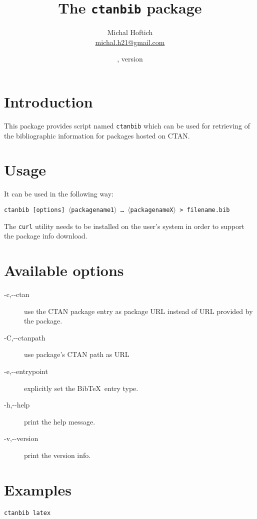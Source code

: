 \documentclass{ltxdoc}
\title{The \texttt{ctanbib} package}
\author{Michal Hoftich\\\href{mailto:michal.h21@gmail.com}{michal.h21@gmail.com}}
\date{\gitdate, version \gitversion}
\newcommand\package[1]{\texttt{#1}}
\begin{document}
\maketitle

\section{Introduction}
This package provides script named \package{ctanbib} which can be used for retrieving of the bibliographic information for packages hosted on CTAN.


\section{Usage}


It can be used in the following way:


\medskip

\noindent\package{ctanbib [options]  $\langle$packagename1$\rangle$ \ldots\ $\langle$packagenameX$\rangle$ > filename.bib}

\medskip

The \texttt{curl} utility needs to be installed on the user's system in order to support the package info download.


\section{Available options}

\begin{description}
  \item[-c,-\/-ctan] use the CTAN package entry as package URL instead of URL provided by the package.
  \item[-C,-\/-ctanpath]   use package's CTAN path as URL
  \item[-e,-\/-entrypoint] explicitly set the Bib\TeX\ entry type.
  \item[-h,-\/-help] print the help message.
  \item[-v,-\/-version] print the version info.
\end{description}


\section{Examples}

\begin{verbatim}
ctanbib latex  
\end{verbatim}
\end{document}
